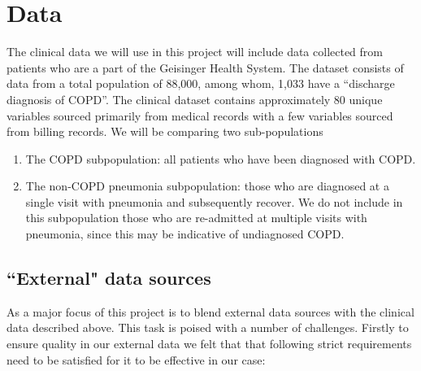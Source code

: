 \documentclass{article}
\begin{document}
\section{Data}

The clinical data we will use in this project will include data collected from patients who are a part of the Geisinger Health System. The dataset consists of data from a total population of 88,000, among whom, 1,033 have a ``discharge diagnosis of COPD''. The clinical dataset contains approximately 80 unique variables sourced primarily from medical records with a few variables sourced from billing records. We will be comparing two sub-populations

\begin{enumerate}
\item The COPD subpopulation: all patients who have been diagnosed with COPD.
\item The non-COPD pneumonia subpopulation: those who are diagnosed at a single visit with pneumonia and subsequently recover. We do not include in this subpopulation those who are re-admitted at multiple visits with pneumonia, since this may be indicative of undiagnosed COPD.
\end{enumerate}



\subsection{``External" data sources}

As a major focus of this project is to blend external data sources with the clinical data described above. This task is poised with a number of challenges. Firstly to ensure quality in our external data we felt that that following 
strict requirements need to be satisfied for it to be effective in our case:
\end{document}
